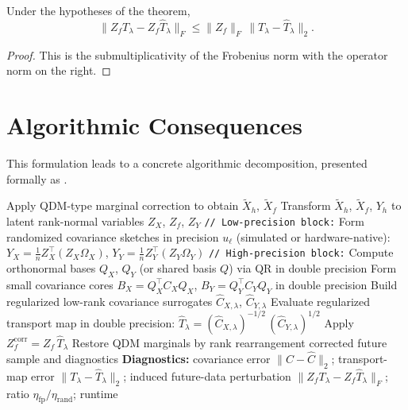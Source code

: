 \begin{corollary}
	Under the hypotheses of the theorem,
	\[
		\|Z_f T_\lambda - Z_f \widehat T_\lambda\|_F
		\le
		\|Z_f\|_F\,\|T_\lambda - \widehat T_\lambda\|_2.
	\]
\end{corollary}

\begin{proof}
	This is the submultiplicativity of the Frobenius norm with the operator norm on
	the right.
\end{proof}

\section{Algorithmic Consequences}

This formulation leads to a concrete algorithmic decomposition, presented formally as .

\begin{algorithm}[t]
	\caption{Mixed-precision randomized covariance transport}
	\label{alg:mp_rand_cov_transport}
	\BlankLine
	Apply QDM-type marginal correction to obtain \(\widetilde X_h\), \(\widetilde X_f\)\;
	Transform \(\widetilde X_h\), \(\widetilde X_f\), \(Y_h\) to latent rank-normal variables \(Z_X\), \(Z_f\), \(Z_Y\)\;
	\texttt{// Low-precision block:}\;
	Form randomized covariance sketches in precision \(u_\ell\) (simulated or hardware-native):
	\(Y_X = \tfrac{1}{n}Z_X^\top(Z_X\Omega_X)\), \quad
	\(Y_Y = \tfrac{1}{n}Z_Y^\top(Z_Y\Omega_Y)\)\;
	\texttt{// High-precision block:}\;
	Compute orthonormal bases \(Q_X\), \(Q_Y\) (or shared basis \(Q\)) via QR in double precision\;
	Form small covariance cores \(B_X = Q_X^\top C_X Q_X\), \(B_Y = Q_Y^\top C_Y Q_Y\) in double precision\;
	Build regularized low-rank covariance surrogates \(\widehat C_{X,\lambda}\), \(\widehat C_{Y,\lambda}\)\;
	Evaluate regularized transport map in double precision:
	\(\widehat T_\lambda = (\widehat C_{X,\lambda})^{-1/2}\,(\widehat C_{Y,\lambda})^{1/2}\)\;
	Apply \(Z_f^{\mathrm{corr}} = Z_f\,\widehat T_\lambda\)\;
	Restore QDM marginals by rank rearrangement\;
	\Return corrected future sample and diagnostics\;
	\BlankLine
	\textbf{Diagnostics:} covariance error \(\|C - \widehat C\|_2\); transport-map error \(\|T_\lambda - \widehat T_\lambda\|_2\); induced future-data perturbation \(\|Z_f T_\lambda - Z_f \widehat T_\lambda\|_F\); ratio \(\eta_{\mathrm{fp}}/\eta_{\mathrm{rand}}\); runtime\;
\end{algorithm}

